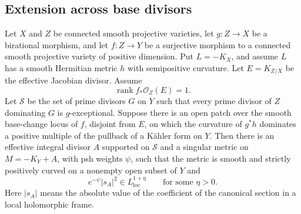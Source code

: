 \subsection{Extension across base divisors}

\begin{proposition}\label{coa:volume-metric}
Let $X$ and $Z$ be connected smooth projective varieties, let
$g:Z\to X$ be a birational morphism, and let $f:Z\to Y$ be a surjective
morphism to a connected smooth projective variety of positive dimension.
Put $L=-K_X$, and assume $L$ has a smooth Hermitian metric $h$ with
semipositive curvature.  Let $E=K_{Z/X}$ be the effective Jacobian divisor.
Assume
\[
 \operatorname{rank} f_*\mathcal O_Z(E)=1.
\]
Let $\mathcal S$ be the set of prime divisors $G$ on $Y$ such that every
prime divisor of $Z$ dominating $G$ is $g$-exceptional.  Suppose there is
an open patch over the smooth base-change locus of $f$, disjoint from
$E$, on which the curvature of $g^*h$ dominates a positive multiple of
the pullback of a K\"ahler form on $Y$.
Then there is an effective integral divisor $A$ supported on
$\mathcal S$ and a singular metric on $M=-K_Y+A$, with psh weights $\psi$,
such that the metric is smooth and strictly positively curved on a
nonempty open subset of $Y$ and
\begin{equation}\label{coa:weighted-lp}
 e^{-\psi}|s_A|^2\in L^{1+\eta}_{\mathrm{loc}}
 \qquad\text{for some }\eta>0.
\end{equation}
Here $|s_A|$ means the absolute value of the coefficient of the canonical
section in a local holomorphic frame.
\end{proposition}

